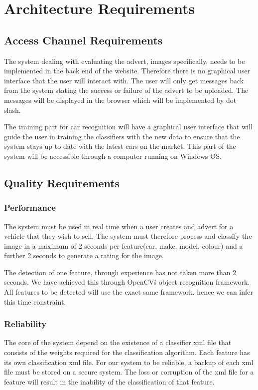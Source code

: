 \section{Architecture Requirements}
\subsection{Access Channel Requirements}
The system dealing with evaluating the advert, images specifically, needs to be implemented in the back end of the website. Therefore there is no graphical user interface that the user will interact with. The user will only get messages back from the system stating the success or failure of the advert to be uploaded. The messages will be displayed in the browser which will be implemented by dot slash. 

The training part for car recognition will have a graphical user interface that will guide the user in training the classifiers with the new data to ensure that the system stays up to date with the latest cars on the market. This part of the system will be accessible through a computer running on Windows OS.

\subsection{Quality Requirements}

\subsubsection{Performance}
The system must be used in real time when a user creates and advert for a vehicle that they wish to sell. The system must therefore process and classify the image in a maximum of 2 seconds per feature(car, make, model, colour) and a further 2 seconds to generate a rating for the image.

The detection of one feature, through experience has not taken more than 2 seconds. We have achieved this through OpenCV\'s object recognition framework. All features to be detected will use the exact same framework. hence we can infer this time constraint. 
\subsubsection{Reliability}
The core of the system depend on the existence of a classifier xml file that consists of the weights required for the classification algorithm. Each feature has its own classification xml file. For our system to be reliable, a backup of each xml file must be stored on a secure system. The loss or corruption of the xml file for a feature will result in the inability of the classification of that feature. 
